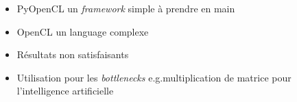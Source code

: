 \begin{frame}
    \begin{itemize}
        \item PyOpenCL un \textit{framework} simple à prendre en main\pause{}
        \item OpenCL un language complexe\pause{}
        \item Résultats non satisfaisants\pause{}
        \item Utilisation pour les \textit{bottlenecks} e.g.\@la multiplication 
            de matrice pour l'intelligence artificielle
    \end{itemize}
\end{frame}
